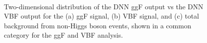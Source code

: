 \captionsetup[subfloat]{captionskip=5pt} %
\begin{figure}[ht]
    \centering
     \\
    {\caption{Two-dimensional distribution of the DNN ggF output vs the DNN VBF output for the (a) ggF signal, (b) VBF signal, and (c) total background from non-Higgs boson events, shown in a common \TwoJet category for the ggF \TwoJet and VBF analysis. 
    \label{fig:2d-discriminant} }}
\end{figure}
